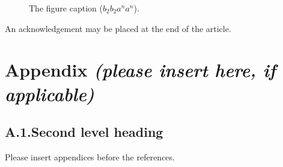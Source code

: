 \documentclass[bimj,fleqn]{w-art}\usepackage[]{graphicx}\usepackage[]{color}
\theoremstyle{plain}
\theoremstyle{definition}
\begin{document}
  \begin{figure}[htb]
  \begin{center}
  \caption{The figure caption ($b_{2}b_{2}a^{n}a^{n}$).}
  \end{center}
  \end{figure}
  \begin{acknowledgement}
  An acknowledgement may be placed at the end of the article.
  \end{acknowledgement}
  \vspace*{1pc}



  \section*{Appendix {\it(please insert here, if applicable)}}

  \subsection*{A.1.\enspace Second level heading}

  Please insert appendices before the references.
\end{document}
